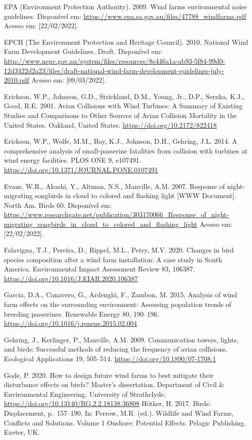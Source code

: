 \documentclass[
  oneside]{scrbook}
\begin{document}
EPA (Environment Protection Authority). 2009. Wind farms environmental noise guidelines. Disponível em: \url{https://www.epa.sa.gov.au/files/47788_windfarms.pdf} Acesso em: {[}22/02/2022{]}.

EPCH (The Environment Protection and Heritage Council). 2010. National Wind Farm Development Guidelines. Draft. Disponível em: \url{http://www.nepc.gov.au/system/files/resources/8e446a1a-ab93-5f84-99d0-12d3422d2a23/files/draft-national-wind-farm-development-guidelines-july-2010.pdf} Acesso em: {[}09/03/2022{]}.

Erickson, W.P., Johnson, G.D., Strickland, D.M., Young, Jr., D.P., Sernka, K.J., Good, R.E. 2001. Avian Collisions with Wind Turbines: A Summary of Existing Studies and Comparisons to Other Sources of Avian Collision Mortality in the United States. Oakland, United States. \url{https://doi.org/10.2172/822418}

Erickson, W.P., Wolfe, M.M., Bay, K.J., Johnson, D.H., Gehring, J.L. 2014. A comprehensive analysis of small-passerine fatalities from collision with turbines at wind energy facilities. PLOS ONE 9, e107491. \url{https://doi.org/10.1371/JOURNAL.PONE.0107491}

Evans, W.R., Akashi, Y., Altman, N.S., Manville, A.M. 2007. Response of night-migrating songbirds in cloud to colored and flashing light {[}WWW Document{]}. North Am. Birds 60. Disponível em: \url{https://www.researchgate.net/publication/303170066_Response_of_night-migrating_songbirds_in_cloud_to_colored_and_flashing_light} Acesso em: {[}22/02/2022{]}.

Falavigna, T.J., Pereira, D., Rippel, M.L., Petry, M.V. 2020. Changes in bird species composition after a wind farm installation: A case study in South America. Environmental Impact Assessment Review 83, 106387. \url{https://doi.org/10.1016/J.EIAR.2020.106387}

Garcia, D.A., Canavero, G., Ardenghi, F., Zambon, M. 2015. Analysis of wind farm effects on the surrounding environment: Assessing population trends of breeding passerines. Renewable Energy 80, 190--196. \url{https://doi.org/10.1016/j.renene.2015.02.004}

Gehring, J., Kerlinger, P., Manville, A.M. 2009. Communication towers, lights, and birds: Successful methods of reducing the frequency of avian collisions. Ecological Applications 19, 505--514. \url{https://doi.org/10.1890/07-1708.1}

Gode, P. 2020. How to design future wind farms to best mitigate their disturbance effects on birds? Master's dissertation. Department of Civil \& Environmental Engineering. University of Strathclyde. \url{https://doi.org/10.13140/RG.2.2.18138.36808}
Hötker, H. 2017. Birds: Displacement, p.~157--190. In: Perrow, M.R. (ed.). Wildlife and Wind Farms, Conflicts and Solutions. Volume 1 Onshore: Potential Effects. Pelagic Publishing. Exeter, UK.
\end{document}
